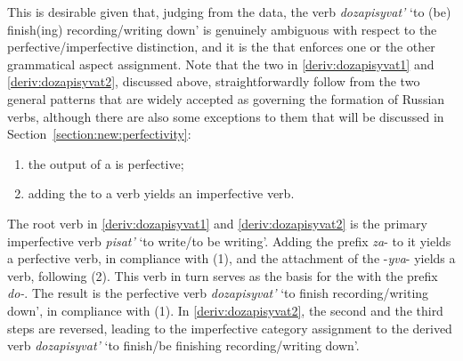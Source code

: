 This is desirable given that, judging from the data, the verb \textit{dozapisyvat'} `to (be) finish(ing) recording/writing down' is genuinely ambiguous with respect to the perfective/imperfective distinction, and it is the  that enforces one or the other grammatical aspect assignment. Note that the two  in \ref{deriv:dozapisyvat1} and \ref{deriv:dozapisyvat2}, discussed above, straightforwardly follow from the two general patterns that are widely accepted as governing the formation of Russian verbs, although there are also some exceptions to them that will be discussed in Section~\ref{section:new:perfectivity}:

\begin{enumerate}
\item the output of a  is perfective;   
\item adding the  to a verb yields an imperfective verb. 
\end{enumerate}

The root verb in \ref{deriv:dozapisyvat1} and \ref{deriv:dozapisyvat2} is the primary imperfective verb \textit{pisat'} `to write/to be writing'. Adding the prefix \textit{za}- to it yields a perfective verb, in compliance with (1), and the attachment of the  -\textit{yva}- yields a  verb, following (2). This verb in turn serves as the basis for the  with the  prefix \textit{do-}. The result is the perfective verb \textit{dozapisyvat'} `to finish recording/writing down', in compliance with (1).  In \ref{deriv:dozapisyvat2}, the second and the third steps are reversed, leading to the imperfective category assignment to the derived verb \textit{dozapisyvat'} `to finish/be finishing recording/writing down'.

